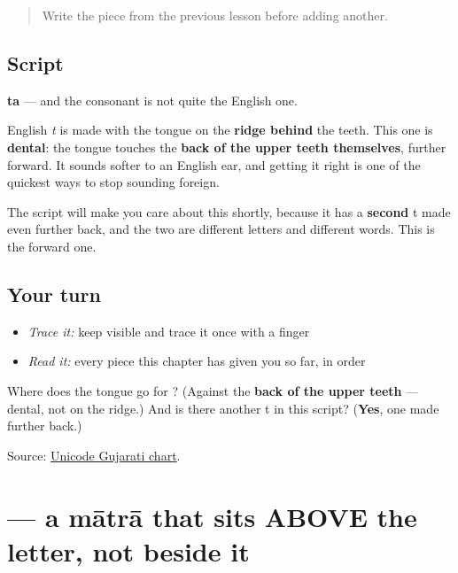 \label{lesson:GU-W01-ta}



\begin{quote}
Write the piece from the previous lesson before adding another.
\end{quote}

\subsection*{Script}
\begin{quote}
\end{quote}

\textbf{ta} — and the consonant is not quite the English one.

English \emph{t} is made with the tongue on the \textbf{ridge behind} the teeth. This one is \textbf{dental}: the tongue touches the \textbf{back of the upper teeth themselves}, further forward. It sounds softer to an English ear, and getting it right is one of the quickest ways to stop sounding foreign.

The script will make you care about this shortly, because it has a \textbf{second} t made even further back, and the two are different letters and different words. This is the forward one.

\subsection*{Your turn}
\begin{itemize}
\raggedright
  \item \emph{Trace it:} keep  visible and trace it once with a finger
  \item \emph{Read it:} every piece this chapter has given you so far, in order
\end{itemize}

\begin{tcolorbox}[breakable,colback=teal!4,colframe=teal!35!black,title={Before you move on}]
Where does the tongue go for \textbf{}? (Against the \textbf{back of the upper teeth} — dental, not on the ridge.) And is there another t in this script? (\textbf{Yes}, one made further back.)

Source: \href{https://www.unicode.org/charts/PDF/U0A80.pdf}{Unicode Gujarati chart}.
\end{tcolorbox}
\section[-e]{ — a mātrā that sits ABOVE the letter, not beside it}

